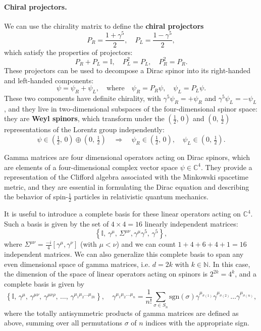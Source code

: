 \paragraph{Chiral projectors.}
We can use the chirality matrix to define the \textbf{chiral projectors}
\begin{equation}
    P_{R} = \frac{1 + \gamma^5}{2}, \quad P_{L} = \frac{1 - \gamma^5}{2},
    \label{eq:chiral_projectors}
\end{equation}
which satisfy the properties of projectors:
\[
    P_R + P_L = \mathbb{I}, \quad P_L^2 = P_L, \quad P_R^2 = P_R.
\]
These projectors can be used to decompose a Dirac spinor into its right-handed and left-handed components:
\[
    \psi = \psi_R + \psi_L, \quad \text{where} \quad \psi_R = P_R \psi, \quad \psi_L = P_L \psi.
\]
These two components have definite chirality, with \(\gamma^5 \psi_R = + \psi_R\) and \(\gamma^5 \psi_L = - \psi_L\), and they live in two-dimensional subspaces of the four-dimensional spinor space: they are \textbf{Weyl spinors}, which transform under the \((\tfrac{1}{2},\,0)\) and \((0,\,\tfrac{1}{2})\) representations of the Lorentz group independently:
\[
    \psi \in \left(\tfrac{1}{2},\,0\right) \oplus \left(0,\,\tfrac{1}{2}\right) \quad \Longrightarrow \quad \psi_R \in \left(\tfrac{1}{2},\,0\right), \quad \psi_L \in \left(0,\,\tfrac{1}{2}\right).
\]

Gamma matrices are four dimensional operators acting on Dirac spinors, which are elements of a four-dimensional complex vector space \(\psi \in \mathbb{C}^4\). They provide a representation of the Clifford algebra associated with the Minkowski spacetime metric, and they are essential in formulating the Dirac equation and describing the behavior of spin-\(\tfrac{1}{2}\) particles in relativistic quantum mechanics.

It is useful to introduce a complete basis for these linear operators acting on \(\mathbb{C}^4\). Such a basis is given by the set of \(4 \times 4 = 16\) linearly independent matrices:
\[
    \left\{ \mathbb{I},\, \gamma^\mu,\, \Sigma^{\mu \nu}, \gamma^{\mu}\gamma^{5},\, \gamma^{5} \right\},
\]
where \(\Sigma^{\mu \nu} = \frac{-i}{4} [\gamma^\mu, \gamma^\nu]\) (with \(\mu<\nu\)) and we can count \(1 + 4 + 6 + 4 + 1 = 16\) independent matrices. We can also generalize this complete basis to span any even dimensional space of gamma matrices, i.e. \(d = 2k\) with \(k \in \mathbb{N}\). In this case, the dimension of the space of linear operators acting on spinors is \(2^{2k} = 4^k\), and a complete basis is given by
\[
    \left\{ \mathbb{I},\, \gamma^{\mu},\, \gamma^{\mu \nu},\, \gamma^{\mu \nu \rho},\, \dots,\, \gamma^{\mu_1 \mu_2 \dots \mu_{2k}} \right\}, \quad \gamma^{\mu_1 \mu_2 \dots \mu_n} = \frac{1}{n!} \sum_{\sigma \in S_n} \text{sgn}(\sigma) \gamma^{\mu_{\sigma(1)}} \gamma^{\mu_{\sigma(2)}} \dots \gamma^{\mu_{\sigma(n)}},
\]
where the totally antisymmetric products of gamma matrices are defined as above, summing over all permutations \(\sigma\) of \(n\) indices with the appropriate sign.

